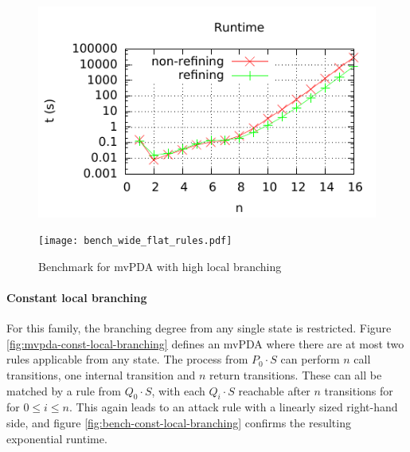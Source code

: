 \begin{figure}[H]
\centering
  \begin{minipage}[b]{.45\textwidth}
    \includegraphics{./graphs/bench_wide_flat_time.pdf}
  \end{minipage}
  \hspace{0.5cm}
  \begin{minipage}[b]{.45\textwidth}
    \texttt{[image: bench\_wide\_flat\_rules.pdf]}
  \end{minipage}
  \caption{Benchmark for mvPDA with high local branching}
  \label{fig:bench-high-local-branching}
\end{figure}

\paragraph{Constant local branching}

For this family, the branching degree from any single state is restricted.
Figure \ref{fig:mvpda-const-local-branching} defines an mvPDA where there
are at most two rules applicable from any state.
The process from $P_0⋅S$ can perform $n$ call transitions, one internal transition
and $n$ return transitions.
These can all be matched by a rule from $Q_0⋅S$, with each $Q_i⋅S$
reachable after $n$ transitions for for $0 ≤ i ≤ n$.
This again leads to an attack rule with a linearly sized right-hand side,
and figure \ref{fig:bench-const-local-branching} confirms the resulting
exponential runtime.

